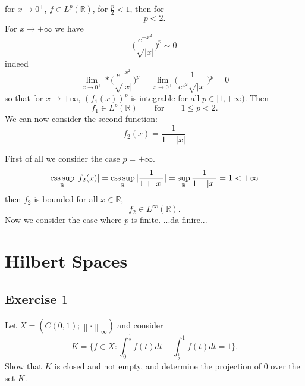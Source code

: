 \documentclass[a4paper, twoside, openany]{book}
\newcommand{\R}{\mathbb{R}}
\newcommand{\esssup}{\operatornamewithlimits{ess\,sup}}
\newcommand{\norm}[1]{\left\lVert#1\right\rVert}
\begin{document}
for $x \rightarrow 0^+$, $f \in L^p(\R)$, for $\frac{p}{2} < 1$, then for
$$p < 2.$$
For $x \rightarrow +\infty$ we have
$$\bigl( \frac{e^{-x^2}}{\sqrt{|x|}} \bigl)^p \sim 0$$
indeed
$$\lim_{x \rightarrow 0^+}* \bigl( \frac{e^{-x^2}}{\sqrt{|x|}} \bigl)^p = \lim_{x \rightarrow 0^+} \bigl(\frac{1}{e^{x^2} \sqrt{|x|}} \bigl)^p = 0$$
so that for $x \rightarrow +\infty$, $(f_1(x))^p$ is integrable for all $p \in [1, +\infty)$. Then
$$f_1 \in L^p(\R) \qquad \textrm{for} \qquad 1 \leq p < 2.$$ 
We can now consider the second function:
$$f_2(x) = \frac{1}{1 + |x|}$$
\begin{figure}[!ht]
\begin{center}
\end{center}
\end{figure}
First of all we consider the case $p = + \infty$.
$$\esssup_{\R} |f_2(x)| = \esssup_{\R} | \frac{1}{1 + |x|}| = \sup_{\R} \frac{1}{1 + |x|} = 1 < +\infty$$
then $f_2$ is bounded for all $x \in \R$,
$$f_2 \in L^{\infty}(\R).$$
Now we consider the case where $p$ is finite.   ...da finire...
\chapter{Hilbert Spaces}
\section*{Exercise $1$}
Let $X = (C(0,1); \norm{ \cdot }_{\infty})$ and consider
$$K = \{ f \in X : \int_0^{\frac{1}{2}} f(t) dt - \int_{\frac{1}{2}}^1 f(t) dt = 1 \}.$$
Show that $K$ is closed and not empty, and determine the projection of $0$ over the set $K$.
\end{document}
